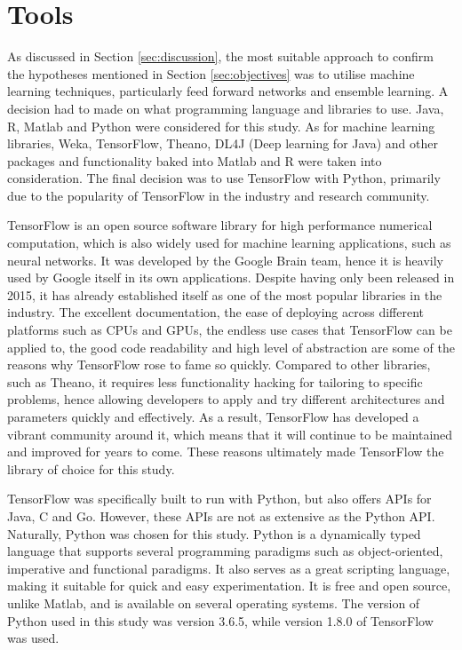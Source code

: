 \documentclass{UoYCSproject}
\begin{document}
\section{Tools}
As discussed in Section \ref{sec:discussion}, the most suitable approach to confirm the hypotheses mentioned in Section \ref{sec:objectives} was to utilise machine learning techniques, particularly feed forward networks and ensemble learning. A decision had to made on what programming language and libraries to use. Java, R, Matlab and Python were considered for this study. As for machine learning libraries, Weka, TensorFlow, Theano, DL4J (Deep learning for Java) and other packages and functionality baked into Matlab and R were taken into consideration. The final decision was to use TensorFlow with Python, primarily due to the popularity of TensorFlow in the industry and research community. 

TensorFlow is an open source software library for high performance numerical computation, which is also widely used for machine learning applications, such as neural networks. It was developed by the Google Brain team, hence it is heavily used by Google itself in its own applications. Despite having only been released in 2015, it has already established itself as one of the most popular libraries in the industry. The excellent documentation, the ease of deploying across different platforms such as CPUs and GPUs, the endless use cases that TensorFlow can be applied to, the good code readability and high level of abstraction are some of the reasons why TensorFlow rose to fame so quickly. Compared to other libraries, such as Theano, it requires less functionality hacking for tailoring to specific problems, hence allowing developers to apply and try different architectures and parameters quickly and effectively. As a result, TensorFlow has developed a vibrant community around it, which means that it will continue to be maintained and improved for years to come. These reasons ultimately made TensorFlow the library of choice for this study.         

TensorFlow was specifically built to run with Python, but also offers APIs for Java, C and Go. However, these APIs are not as extensive as the Python API. Naturally, Python was chosen for this study. Python is a dynamically typed language that supports several programming paradigms such as object-oriented, imperative and functional paradigms. It also serves as a great scripting language, making it suitable for quick and easy experimentation. It is free and open source, unlike Matlab, and is available on several operating systems. The version of Python used in this study was version 3.6.5, while version 1.8.0 of TensorFlow was used.
\end{document}
